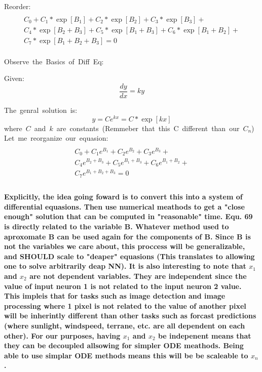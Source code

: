 \documentclass{article}
\begin{document}
\hbox{Reorder:}
\begin{multline}\\
    C_0 + C_1*\exp[B_1] + C_2*\exp[B_2] + C_3*\exp[B_3] +\\
    C_4*\exp[B_2+B_3] + C_5*\exp[B_1+B_3] + C_6*\exp[B_1+B_2] +\\
    C_7*\exp[B_1+B_2+B_3] = 0\\
\end{multline}

\hbox{Observe the Basics of Diff Eq:}

\hbox{Given:}
\begin{equation}
    \frac{dy}{dx} = ky
\end{equation}

\hbox{The genral solution is:}
\begin{equation}
    y = Ce^{kx} = C*\exp[kx]
\end{equation}
\hbox{where $C$ and $k$ are constants (Remmeber that this C different than our $C_n$)}\\

\hbox{Let me reorganize our equasion:}
\begin{multline}\\
    C_0 + 
    C_1e^{B_1} + 
    C_2e^{B_2} + 
    C_3e^{B_3} +\\
    C_4e^{B_2+B_3} + 
    C_5e^{B_1+B_3} + 
    C_6e^{B_1+B_2} +\\
    C_7e^{B_1+B_2+B_3} = 0\\
\end{multline}


\paragraph{Explicitly, the idea going foward is to convert this into a system of differential equasions. Then use numerical meathods to get a 
"close enough" solution that can be computed in "reasonable" time.  Equ. 69 is directly related to the variable B. Whatever method used
to aproxomate B can be used again for the components of B. Since B is not the variables we care about, this proccess will be generalizable,
and SHOULD scale to "deaper" equasions (This translates to allowing one to solve arbitrarily deap NN). It is also interesting to note that 
$x_1$ and $x_2$ are not dependent variables. They are independent since the value of input neuron 1 is not related to the input neuron 2 value.
This impleis that for tasks such as image detection and image processing where 1 pixel is not related to the value of another pixel will be 
inherintly different than other tasks such as forcast predictions (where sunlight, windspeed, terrane, etc. are all dependent on each other).
For our purposes, having $x_1$ and $x_2$ be indepenent means that they can be decoupled allsowing for simpler ODE meathods. Being able to
use simplar ODE methods means this will be be scaleable to $x_n$.}
\end{document}
